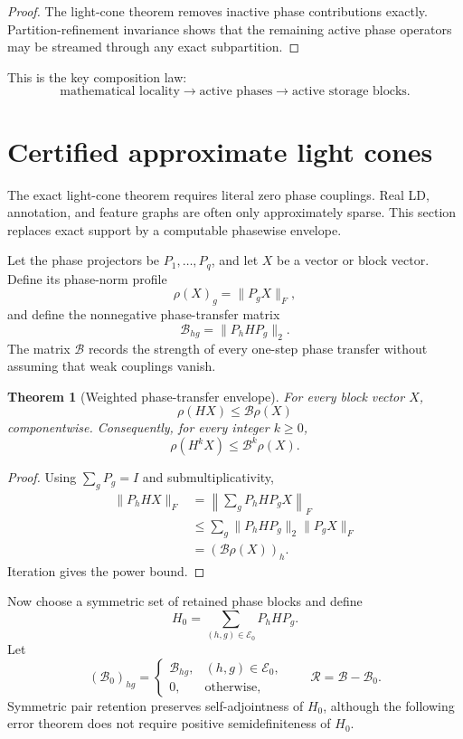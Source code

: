 \documentclass[11pt]{article}
\newtheorem{theorem}{Theorem}[section]
\theoremstyle{definition}
\theoremstyle{remark}
\begin{document}
\begin{proof}
The light-cone theorem removes inactive phase contributions exactly.
Partition-refinement invariance shows that the remaining active phase
operators may be streamed through any exact subpartition.
\end{proof}

This is the key composition law:
\[
\boxed{
\text{mathematical locality}
\longrightarrow
\text{active phases}
\longrightarrow
\text{active storage blocks}.
}
\]

\section{Certified approximate light cones}
\label{sec:approx-lightcone}

The exact light-cone theorem requires literal zero phase couplings.  Real LD,
annotation, and feature graphs are often only approximately sparse.  This
section replaces exact support by a computable phasewise envelope.

Let the phase projectors be $P_1,\ldots,P_q$, and let $X$ be a vector or block
vector.  Define its phase-norm profile
\[
\rho(X)_g=\lVert P_gX\rVert_F,
\]
and define the nonnegative phase-transfer matrix
\[
\mathcal B_{hg}=\lVert P_hHP_g\rVert_2.
\]
The matrix $\mathcal B$ records the strength of every one-step phase transfer
without assuming that weak couplings vanish.

\begin{theorem}[Weighted phase-transfer envelope]
\label{thm:weighted-transfer}
For every block vector $X$,
\[
\boxed{
\rho(HX)\leq \mathcal B\rho(X)
}
\]
componentwise.  Consequently, for every integer $k\geq0$,
\[
\boxed{
\rho(H^kX)\leq \mathcal B^k\rho(X).
}
\]
\end{theorem}

\begin{proof}
Using $\sum_gP_g=I$ and submultiplicativity,
\[
\begin{aligned}
\lVert P_hHX\rVert_F
&=\left\lVert\sum_gP_hHP_gX\right\rVert_F\\
&\leq\sum_g\lVert P_hHP_g\rVert_2\lVert P_gX\rVert_F\\
&=(\mathcal B\rho(X))_h.
\end{aligned}
\]
Iteration gives the power bound.
\end{proof}

Now choose a symmetric set of retained phase blocks and define
\[
H_0=\sum_{(h,g)\in\mathcal E_0}P_hHP_g.
\]
Let
\[
(\mathcal B_0)_{hg}=
\begin{cases}
\mathcal B_{hg},&(h,g)\in\mathcal E_0,\\
0,&\text{otherwise},
\end{cases}
\qquad
\mathcal R=\mathcal B-\mathcal B_0.
\]
Symmetric pair retention preserves self-adjointness of $H_0$, although the
following error theorem does not require positive semidefiniteness of $H_0$.
\end{document}
